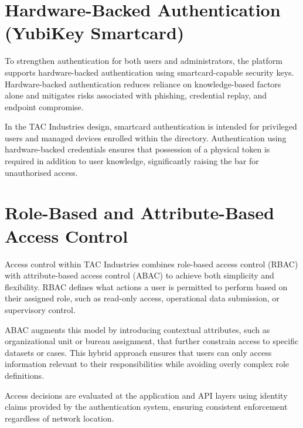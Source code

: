 \section{Hardware-Backed Authentication (YubiKey Smartcard)}

To strengthen authentication for both users and administrators, the platform supports hardware-backed authentication using smartcard-capable security keys. Hardware-backed authentication reduces reliance on knowledge-based factors alone and mitigates risks associated with phishing, credential replay, and endpoint compromise.

In the TAC Industries design, smartcard authentication is intended for privileged users and managed devices enrolled within the directory. Authentication using hardware-backed credentials ensures that possession of a physical token is required in addition to user knowledge, significantly raising the bar for unauthorised access.


\section{Role-Based and Attribute-Based Access Control}

Access control within TAC Industries combines role-based access control (RBAC) with attribute-based access control (ABAC) to achieve both simplicity and flexibility\cite{sandhuRBAC}. RBAC defines what actions a user is permitted to perform based on their assigned role, such as read-only access, operational data submission, or supervisory control.

ABAC augments this model by introducing contextual attributes, such as organizational unit or bureau assignment, that further constrain access to specific datasets or cases. This hybrid approach ensures that users can only access information relevant to their responsibilities while avoiding overly complex role definitions.

Access decisions are evaluated at the application and API layers using identity claims provided by the authentication system, ensuring consistent enforcement regardless of network location.

\vspace{1.5\baselineskip}


